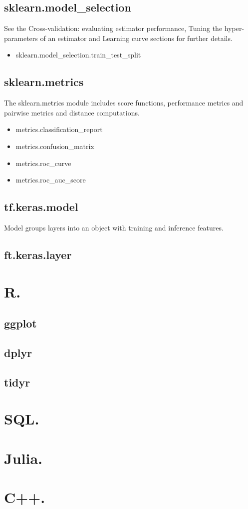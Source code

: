 \documentclass[12pt, a4paper]{book}
\begin{document}
\chapter{sklearn.model\_selection}
See the Cross-validation: evaluating estimator performance, Tuning the hyper-parameters of an estimator and Learning curve sections for further details.
\begin{itemize}
	\item sklearn.model\_selection.train\_test\_split
\end{itemize}

\chapter{sklearn.metrics}
The sklearn.metrics module includes score functions, performance metrics and pairwise metrics and distance computations.

\begin{itemize}
	\item metrics.classification\_report
	\item metrics.confusion\_matrix
	\item metrics.roc\_curve
	\item metrics.roc\_auc\_score
\end{itemize}

\chapter{tf.keras.model}
Model groups layers into an object with training and inference features.
\chapter{ft.keras.layer}

\part{R.}
\chapter{ggplot}
\chapter{dplyr}
\chapter{tidyr} 

\part{SQL.}


\part{Julia.}

\part{C++.}

\nocite{*}
 

\end{document}
